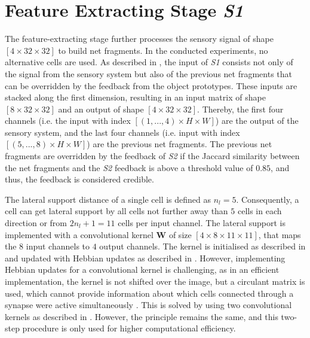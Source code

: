 \section{Feature Extracting Stage \emph{S1}}
The feature-extracting stage further processes the sensory signal of shape $[4 \times 32 \times 32]$ to build net fragments. In the conducted experiments, no alternative cells are used. As described in , the input of \emph{S1} consists not only of the signal from the sensory system but also of the previous net fragments that can be overridden by the feedback from the object prototypes.
These inputs are stacked along the first dimension, resulting in an input matrix of shape $[8 \times 32 \times 32]$ and an output of shape $[4 \times 32 \times 32]$.
Thereby, the first four channels (i.e. the input with index $[(1, ..., 4) \times H \times W]$) are the output of the sensory system, and the last four channels (i.e. input with index $[(5, ..., 8) \times H \times W]$) are the previous net fragments.
The previous net fragments are overridden by the feedback of \emph{S2} if the Jaccard similarity between the net fragments and the \emph{S2} feedback is above a threshold value of $0.85$, and thus, the feedback is considered credible.

The lateral support distance of a single cell is defined as $n_l=5$. Consequently, a cell can get lateral support by all cells not further away than $5$ cells in each direction or from $2n_l+1=11$ cells per input channel.
The lateral support is implemented with a convolutional kernel $\boldsymbol{W}$ of size $[4 \times 8 \times 11 \times 11]$, that maps the $8$ input channels to $4$ output channels.
The kernel is initialised as described in  and updated with Hebbian updates as described in .
However, implementing Hebbian updates for a convolutional kernel is challenging, as in an efficient implementation, the kernel is not shifted over the image, but a circulant matrix is used, which cannot provide information about which cells connected through a synapse were active simultaneously . This is solved by using two convolutional kernels as described in . However, the principle remains the same, and this two-step procedure is only used for higher computational efficiency.

